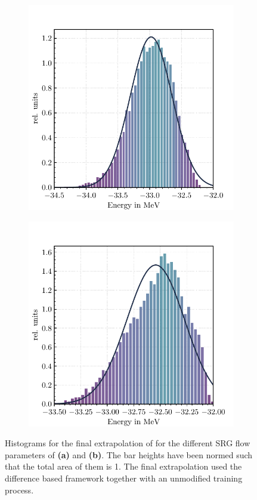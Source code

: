 \begin{figure}[H]
  \begin{subfigure}{.5\textwidth}
    \includegraphics[width=\textwidth]{media/li6_0400_histogram.pdf}
    \caption{}
  \end{subfigure}
  \begin{subfigure}{.5\textwidth}
    \includegraphics[width=\textwidth]{media/li6_0800_histogram.pdf}
    \caption{}
  \end{subfigure}
  \caption{Histograms for the final extrapolation of  for the different SRG flow parameters of  \textbf{(a)} and  \textbf{(b)}. The bar heights have been normed such that the total area of them is 1. The final extrapolation used the difference based framework together with an unmodified training process.}
  \label{fig:hists_li6}
\end{figure}
